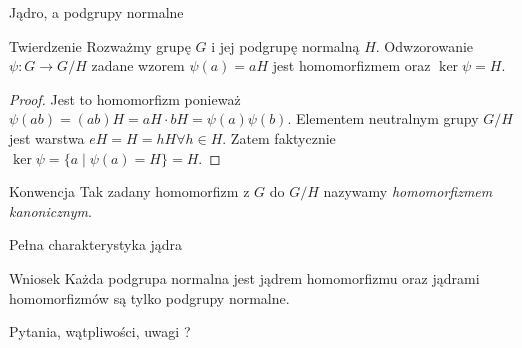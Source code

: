 \documentclass{beamer}
\begin{document}
\begin{frame}{Jądro, a podgrupy normalne}
    \begin{block}{Twierdzenie}
        Rozważmy grupę $G$ i jej podgrupę normalną $H$. Odwzorowanie $\psi : G \rightarrow G/H$ zadane wzorem $\psi(a) = aH$
        jest homomorfizmem oraz $\ker \psi = H$.
    \end{block}
    \pause 
    \begin{proof}
        Jest to homomorfizm ponieważ $\psi(ab) = (ab)H = aH \cdot bH = \psi(a)\psi(b)$. Elementem neutralnym grupy $G/H$ jest warstwa $eH = H = hH \forall h \in H.$
        Zatem faktycznie $\ker \psi = \{ a \mid \psi(a) = H\} = H$. 
    \end{proof}    
    \pause 
    \begin{alertblock}{Konwencja}
        Tak zadany homomorfizm z $G$ do $G/H$ nazywamy \textit{homomorfizmem kanonicznym}.
    \end{alertblock}
\end{frame}

\begin{frame}{Pełna charakterystyka jądra}
    \begin{alertblock}{Wniosek}
        Każda podgrupa normalna jest jądrem homomorfizmu oraz jądrami homomorfizmów są tylko podgrupy normalne.
    \end{alertblock}
\end{frame}

\begin{frame}
    \centering 
    \LARGE Pytania, wątpliwości, uwagi ? 
\end{frame}
\end{document}

